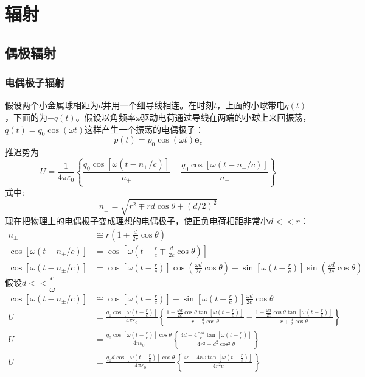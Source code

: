 \cleardoublepage
\section{辐射}
\subsection{偶极辐射}
\subsubsection{电偶极子辐射}
假设两个小金属球相距为$d$并用一个细导线相连。在时刻$t$，上面的小球带电$q(t)$，下面的为$-q(t)$。假设以角频率$\omega$驱动电荷通过导线在两端的小球上来回振荡，$q(t)=q_0\cos(\omega t)$这样产生一个振荡的电偶极子：
\begin{equation}
    p(t)=p_0\cos(\omega t)\boldsymbol{e}_z
\end{equation}
推迟势为
\begin{equation}
    U=\frac{1}{4\pi\varepsilon_0}\left\{\frac{q_0\cos\left[\omega\left(t-n_+/c\right)\right]}{n_+}
    -\frac{q_0\cos\left[\omega\left(t-n_-/c\right)\right]}{n_-}\right\}
\end{equation}
式中:
$$n_\pm =\sqrt{r^2\mp rd\cos\theta+\left(d/2\right)^2}$$
现在把物理上的电偶极子变成理想的电偶极子，使正负电荷相距非常小$d<<r$：
\begin{align*}
    n_\pm &\cong   r\left(1\mp\frac{d}{2r}\cos\theta\right)\\
    \cos\left[\omega\left(t-n_\pm/c\right)\right]&=
    \cos\left[\omega\left(t-\frac{r}{c}\mp\frac{d}{2c}\cos\theta\right)\right]\\
    \cos\left[\omega\left(t-n_\pm/c\right)\right]&=
    \cos\left[\omega\left(t-\frac{r}{c}\right)\right]\cos\left(\frac{\omega d}{2c}\cos\theta\right)\mp
    \sin\left[\omega\left(t-\frac{r}{c}\right)\right]\sin\left(\frac{\omega d}{2c}\cos\theta\right)
\end{align*}
假设$d<<\dfrac{c}{\omega}$
\begin{align*}
    \cos\left[\omega\left(t-n_\pm/c\right)\right]&\cong
    \cos\left[\omega\left(t-\frac{r}{c}\right)\right]\mp
    \sin\left[\omega\left(t-\frac{r}{c}\right)\right]\frac{\omega d}{2c}\cos\theta\\
    U&=\frac{q_0\cos\left[\omega\left(t-\frac{r}{c}\right)\right]}{4\pi\varepsilon_0}\left\{\frac{1-
    \frac{\omega d}{2c}\cos\theta\tan\left[\omega\left(t-\frac{r}{c}\right)\right]}{r-\frac{d}{2}\cos\theta}
    -\frac{1+
    \frac{\omega d}{2c}\cos\theta\tan\left[\omega\left(t-\frac{r}{c}\right)\right]}{r+\frac{d}{2}\cos\theta}\right\}\\
    U&=\frac{q_0\cos\left[\omega\left(t-\frac{r}{c}\right)\right]\cos\theta}{4\pi\varepsilon_0}\left\{\frac{
    4d-4\frac{r\omega d}{c}\tan\left[\omega\left(t-\frac{r}{c}\right)\right]}{4r^2-d^2\cos^2\theta}
    \right\}\\
    U&=\frac{q_0d\cos\left[\omega\left(t-\frac{r}{c}\right)\right]\cos\theta}{4\pi\varepsilon_0}\left\{\frac{
    4c-4r\omega\tan\left[\omega\left(t-\frac{r}{c}\right)\right] }{4r^2c}
    \right\}\\
\end{align*}
